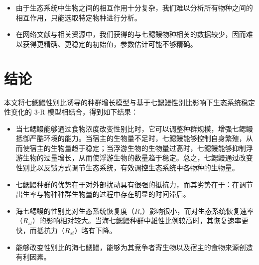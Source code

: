 \documentclass[11pt,a4paper]{ctexart}
\begin{document}
\begin{itemize}
\item 由于生态系统中生物之间的相互作用十分复杂，我们难以分析所有物种之间的相互作用，只能选取特定物种进行分析。
\item 在网络文献与相关资源中，我们获得的与七鳃鳗物种相关的数据较少，因而难以获得更精确、更稳定的初始值，参数估计可能不够精确。
\end{itemize}

\section{结论}

本文将七鳃鳗性别比诱导的种群增长模型与基于七鳃鳗性别比影响下生态系统稳定性变化的 3-R 模型相结合，得到如下结果：

\begin{itemize}
\item 当七鳃鳗能够通过食物浓度改变性别比时，它可以调整种群规模，增强七鳃鳗抵御严酷环境的能力。当宿主的生物量不足时，七鳃鳗能够控制自身繁殖，从而使宿主的生物量趋于稳定；当浮游生物的生物量过高时，七鳃鳗能够抑制浮游生物的过量增长，从而使浮游生物的数量趋于稳定。总之，七鳃鳗通过改变性别比以反馈方式调节生态系统，有效调控生态系统中各物种的生物量。
\item 七鳃鳗种群的优势在于对外部扰动具有很强的抵抗力，而其劣势在于：在调节出生率与物种种群生物量的过程中存在明显的时间滞后。
\item 海七鳃鳗的性别比对生态系统恢复度（$R_c$）影响很小，而对生态系统恢复速率（$R_{sl}$）的影响相对较大。当海七鳃鳗种群中雄性比例较高时，其恢复速率更快，而抵抗力（$R_{st}$）略有下降。
\item 能够改变性别比的海七鳃鳗，能够为其竞争者寄生物以及宿主的食物来源创造有利因素。
\end{itemize}
\end{document}
